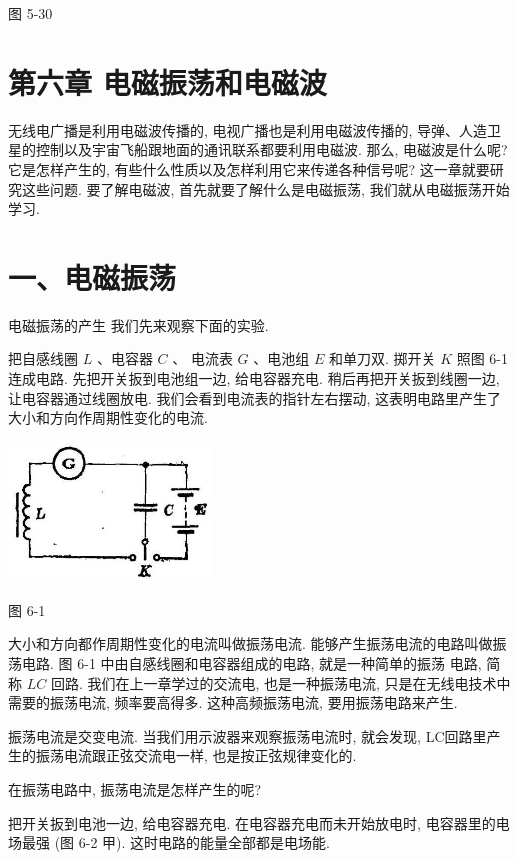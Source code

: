 \documentclass[10pt]{article}
\begin{document}
图 5-30

\section*{第六章 电磁振荡和电磁波}

无线电广播是利用电磁波传播的, 电视广播也是利用电磁波传播的, 导弹、人造卫星的控制以及宇宙飞船跟地面的通讯联系都要利用电磁波. 那么, 电磁波是什么呢? 它是怎样产生的, 有些什么性质以及怎样利用它来传递各种信号呢? 这一章就要研究这些问题. 要了解电磁波, 首先就要了解什么是电磁振荡, 我们就从电磁振荡开始学习.

\section*{一、电磁振荡}

电磁振荡的产生 我们先来观察下面的实验.

把自感线圈 \(L\) 、电容器 \(C\) 、 电流表 \(G\) 、电池组 \(E\) 和单刀双. 掷开关 \(K\) 照图 6-1 连成电路. 先把开关扳到电池组一边, 给电容器充电. 稍后再把开关扳到线圈一边, 让电容器通过线圈放电. 我们会看到电流表的指针左右摆动, 这表明电路里产生了大小和方向作周期性变化的电流.

\begin{center}
\includegraphics[max width=0.4\textwidth]{images/01913056-1f15-74d8-9184-9aab52c9d66b_193_871794.jpg}
\end{center}

图 6-1

大小和方向都作周期性变化的电流叫做振荡电流. 能够产生振荡电流的电路叫做振荡电路. 图 6-1 中由自感线圈和电容器组成的电路, 就是一种简单的振荡 电路, 简称 \({LC}\) 回路. 我们在上一章学过的交流电, 也是一种振荡电流, 只是在无线电技术中需要的振荡电流, 频率要高得多. 这种高频振荡电流, 要用振荡电路来产生.

振荡电流是交变电流. 当我们用示波器来观察振荡电流时, 就会发现, LC回路里产生的振荡电流跟正弦交流电一样, 也是按正弦规律变化的.

在振荡电路中, 振荡电流是怎样产生的呢?

把开关扳到电池一边, 给电容器充电. 在电容器充电而未开始放电时, 电容器里的电场最强 (图 6-2 甲). 这时电路的能量全部都是电场能.
\end{document}
